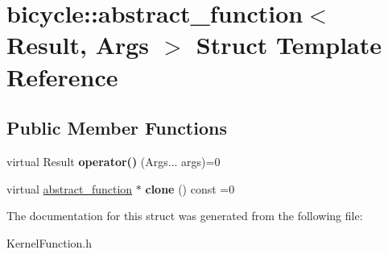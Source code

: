 \hypertarget{structbicycle_1_1abstract__function}{}\section{bicycle\+:\+:abstract\+\_\+function$<$ Result, Args $>$ Struct Template Reference}
\label{structbicycle_1_1abstract__function}
\subsection*{Public Member Functions}
\begin{DoxyCompactItemize}
\item 
\mbox{\label{structbicycle_1_1abstract__function_a6266851bcfef26f02e3f6757a41de8ed}} 
virtual Result {\bfseries operator()} (Args... args)=0
\item 
\mbox{\label{structbicycle_1_1abstract__function_a2e83f4c4890bed0be6fcbc28fbe215ed}} 
virtual \hyperlink{structbicycle_1_1abstract__function}{abstract\+\_\+function} $\ast$ {\bfseries clone} () const =0
\end{DoxyCompactItemize}


The documentation for this struct was generated from the following file\+:\begin{DoxyCompactItemize}
\item 
Kernel\+Function.\+h\end{DoxyCompactItemize}
